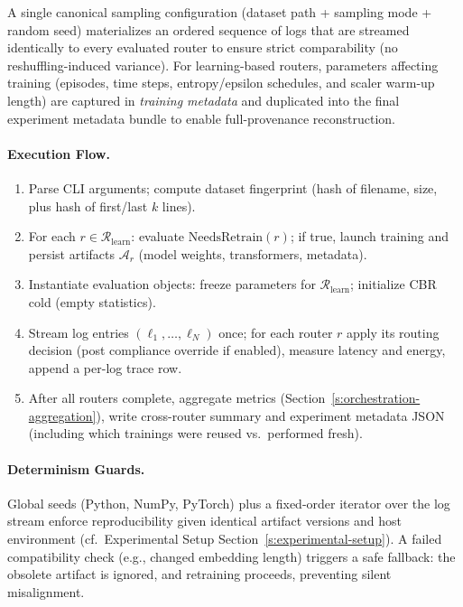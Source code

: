 A single canonical sampling configuration (dataset path + sampling mode + random seed) materializes an ordered sequence of logs that are streamed identically to every evaluated router to ensure strict comparability (no reshuffling-induced variance). For learning-based routers, parameters affecting training (episodes, time steps, entropy/epsilon schedules, and scaler warm-up length) are captured in \emph{training metadata} and duplicated into the final experiment metadata bundle to enable full-provenance reconstruction.

\paragraph{Execution Flow.}
\begin{enumerate}
    \item Parse CLI arguments; compute dataset fingerprint (hash of filename, size, plus hash of first/last $k$ lines).
    \item For each $r \in \mathcal{R}_{\text{learn}}$: evaluate $\text{NeedsRetrain}(r)$; if true, launch training and persist artifacts $\mathcal{A}_r$ (model weights, transformers, metadata).
    \item Instantiate evaluation objects: freeze parameters for $\mathcal{R}_{\text{learn}}$; initialize CBR cold (empty statistics).
    \item Stream log entries $(\ell_1,\ldots,\ell_N)$ once; for each router $r$ apply its routing decision (post compliance override if enabled), measure latency and energy, append a per-log trace row.
    \item After all routers complete, aggregate metrics (Section~\ref{s:orchestration-aggregation}), write cross-router summary and experiment metadata JSON (including which trainings were reused vs.\ performed fresh).
\end{enumerate}

\paragraph{Determinism Guards.} Global seeds (Python, NumPy, PyTorch) plus a fixed-order iterator over the log stream enforce reproducibility given identical artifact versions and host environment (cf.~Experimental Setup Section~\ref{s:experimental-setup}). A failed compatibility check (e.g., changed embedding length) triggers a safe fallback: the obsolete artifact is ignored, and retraining proceeds, preventing silent misalignment.

